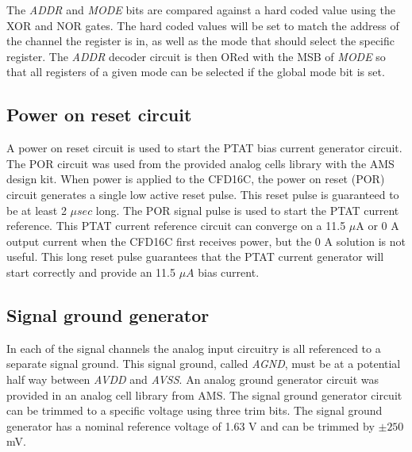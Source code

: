 \documentclass[12pt,oneside,final]{siuethesis}
\theoremstyle{definition}
\begin{document}
\par The \emph{ADDR} and \emph{MODE} bits are compared against a hard coded value using the XOR and NOR gates. The hard coded values will be set to match the address of the channel the register is in, as well as the mode that should select the specific register. The \emph{ADDR} decoder circuit is then ORed with the MSB of \emph{MODE} so that all registers of a given mode can be selected if the global mode bit is set.

\subsection{Power on reset circuit}
\par A power on reset circuit is used to start the PTAT bias current generator circuit. The POR circuit was used from the provided analog cells library with the AMS design kit. When power is applied to the CFD16C, the power on reset (POR) circuit generates a single low active reset pulse. This reset pulse is guaranteed to be at least 2 $\mu sec$ long. The POR signal pulse is used to start the PTAT current reference. This PTAT current reference circuit can converge on a 11.5 $\mu$A or 0 A output current when the CFD16C first receives power, but the 0 A solution is not useful. This long reset pulse guarantees that the PTAT current generator will start correctly and provide an 11.5 $\mu A$ bias current.

\subsection{Signal ground generator}
\par In each of the signal channels the analog input circuitry is all referenced to a separate signal ground. This signal ground, called \emph{AGND}, must be at a potential half way between \emph{AVDD} and \emph{AVSS}. An analog ground generator circuit was provided in an analog cell library from AMS. The signal ground generator circuit can be trimmed to a specific voltage using three trim bits. The signal ground generator has a nominal reference voltage of 1.63 V and can be trimmed by $\pm 250$ mV.
\end{document}
